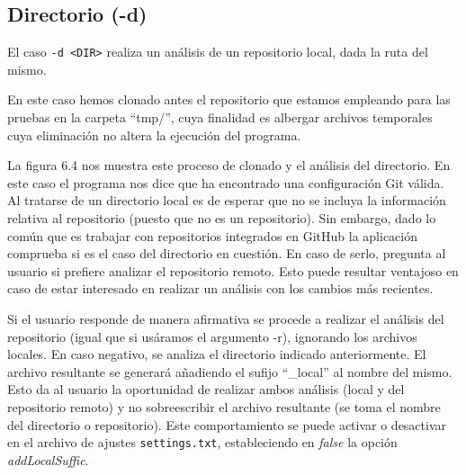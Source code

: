 \documentclass[a4paper, 12pt]{book}
\begin{document}
\subsection{Directorio (-d)}

El caso \texttt{-d <DIR>} realiza un análisis de un repositorio local, dada la ruta del mismo. 

En este caso hemos clonado antes el repositorio que estamos empleando para las pruebas en la carpeta ``tmp/'', cuya finalidad es albergar archivos temporales cuya eliminación no altera la ejecución del programa.

La figura 6.4 nos muestra este proceso de clonado y el análisis del directorio. En este caso el programa nos dice que ha encontrado una configuración Git válida. Al tratarse de un directorio local es de esperar que no se incluya la información relativa al repositorio (puesto que no es un repositorio). Sin embargo, dado lo común que es trabajar con repositorios integrados en GitHub la aplicación comprueba si es el caso del directorio en cuestión. En caso de serlo, pregunta al usuario si prefiere analizar el repositorio remoto. Esto puede resultar ventajoso en caso de estar interesado en realizar un análisis con los cambios más recientes. 

Si el usuario responde de manera afirmativa se procede a realizar el análisis del repositorio (igual que si usáramos el argumento -r), ignorando los archivos locales. En caso negativo, se analiza el directorio indicado anteriormente. El archivo resultante se generará añadiendo el sufijo ``\_local'' al nombre del mismo. Esto da al usuario la oportunidad de realizar ambos análisis (local y del repositorio remoto) y no sobreescribir el archivo resultante (se toma el nombre del directorio o repositorio). Este comportamiento se puede activar o desactivar en el archivo de ajustes \texttt{settings.txt}, estableciendo en \textit{false} la opción \textit{addLocalSuffic}.
\end{document}
